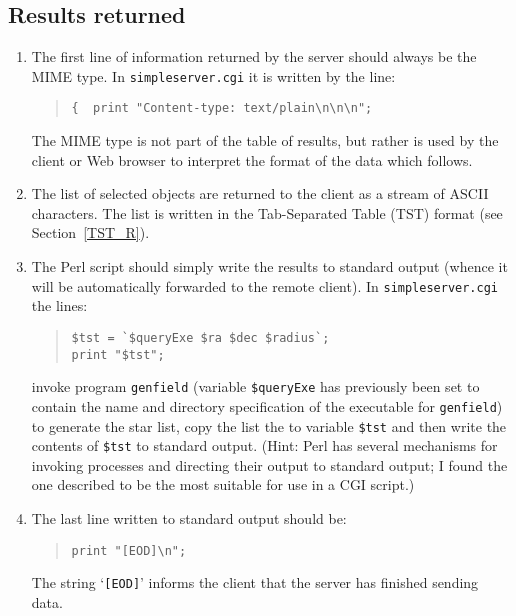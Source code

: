 \documentclass[twoside,11pt]{article}
\renewcommand{\_}{\texttt{\symbol{95}}}
\begin{document}
\subsection{Results returned}

\begin{enumerate}

  \item The first line of information returned by the server should
   always be the MIME type.  In {\tt simpleserver.cgi} it is written by
   the line:

  \begin{quote}
   \verb+{  print "Content-type: text/plain\n\n\n";+
  \end{quote}

   The MIME type is not part of the table of results, but rather is
   used by the client or Web browser to interpret the format of the data
   which follows.

  \item The list of selected objects are returned to the client as a
   stream of ASCII characters.  The list is written in the Tab-Separated
   Table (TST) format (see Section~\ref{TST_R}).

  \item The Perl script should simply write the results to standard
   output (whence it will be automatically forwarded to the remote
   client).  In {\tt simpleserver.cgi} the lines:

  \begin{quote}
   \verb-$tst = `$queryExe $ra $dec $radius`;- \\
   \verb-print "$tst";-
  \end{quote}

   invoke program {\tt genfield} (variable \verb-$queryExe- has
   previously been set to contain the name and directory specification
   of the executable for {\tt genfield}) to generate the star list,
   copy the list the to variable \verb-$tst- and then write the contents
   of \verb-$tst- to standard output.  (Hint: Perl has several mechanisms
   for invoking processes and directing their output to standard output;
   I found the one described to be the most suitable for use in a CGI
   script.)

  \item The last line written to standard output should be:

  \begin{quote}
   \verb-print "[EOD]\n";-
  \end{quote}

   The string `{\tt [EOD]}' informs the client that the server has
   finished sending data.

\end{enumerate}
\end{document}
